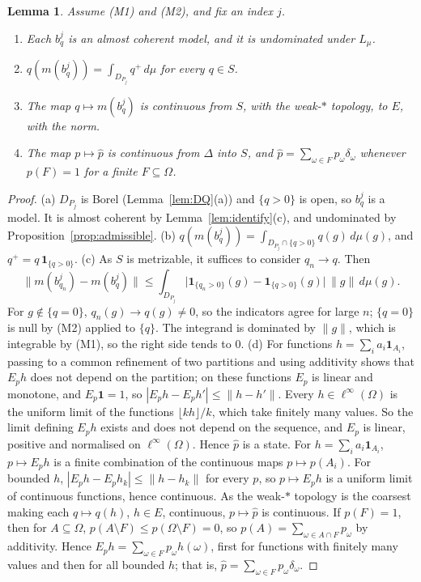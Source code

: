 \documentclass[11pt]{article}
\newtheorem{lemma}[theorem]{Lemma}
\theoremstyle{definition}
\newcommand{\one}{\mathbf 1}
\newcommand{\Lmu}{L_\mu}
\begin{document}
\begin{lemma}\label{lem:assigned}
Assume (M1) and (M2), and fix an index $j$.
\begin{enumerate}[label=(\alph*)]
\item Each $b^j_q$ is an almost coherent model, and it is undominated under $\Lmu$.
\item $q(m(b^j_q))=\int_{D_{P_j}}q^+\,d\mu$ for every $q\in S$.
\item The map $q\mapsto m(b^j_q)$ is continuous from $S$, with the weak-$\ast$ topology, to $E$, with the norm.
\item {\color{red}The map $p\mapsto\hat p$ is continuous from $\Delta$ into $S$, and $\hat p=\sum_{\omega\in F}p_\omega\delta_\omega$ whenever $p(F)=1$ for a finite $F\subseteq\Omega$.}
\end{enumerate}
\end{lemma}
\begin{proof}
(a) $D_{P_j}$ is Borel (Lemma~\ref{lem:DQ}(a)) and $\{q>0\}$ is open, so $b^j_q$ is a model. It is almost coherent by Lemma~\ref{lem:identify}(c), and undominated by Proposition~\ref{prop:admissible}.
(b) $q(m(b^j_q))=\int_{D_{P_j}\cap\{q>0\}}q(g)\,d\mu(g)$, and $q^+=q\,\one_{\{q>0\}}$.
(c) As $S$ is metrizable, it suffices to consider $q_n\to q$. Then
\[
\bigl\|m(b^j_{q_n})-m(b^j_q)\bigr\|\le\int_{D_{P_j}}\bigl|\one_{\{q_n>0\}}(g)-\one_{\{q>0\}}(g)\bigr|\,\|g\|\,d\mu(g).
\]
For $g\notin\{q=0\}$, $q_n(g)\to q(g)\ne0$, so the indicators agree for large $n$; $\{q=0\}$ is null by (M2) applied to $\{q\}$. The integrand is dominated by $\|g\|$, which is integrable by (M1), so the right side tends to $0$.
{\color{red}(d) For functions $h=\sum_ia_i\one_{A_i}$, passing to a common refinement of two partitions and using additivity shows that $E_ph$ does not depend on the partition; on these functions $E_p$ is linear and monotone, and $E_p\one=1$, so $|E_ph-E_ph'|\le\|h-h'\|$. Every $h\in\ell^\infty(\Omega)$ is the uniform limit of the functions $\lfloor kh\rfloor/k$, which take finitely many values. So the limit defining $E_ph$ exists and does not depend on the sequence, and $E_p$ is linear, positive and normalised on $\ell^\infty(\Omega)$. Hence $\hat p$ is a state. For $h=\sum_ia_i\one_{A_i}$, $p\mapsto E_ph$ is a finite combination of the continuous maps $p\mapsto p(A_i)$. For bounded $h$, $|E_ph-E_ph_k|\le\|h-h_k\|$ for every $p$, so $p\mapsto E_ph$ is a uniform limit of continuous functions, hence continuous. As the weak-$\ast$ topology is the coarsest making each $q\mapsto q(h)$, $h\in E$, continuous, $p\mapsto\hat p$ is continuous. If $p(F)=1$, then for $A\subseteq\Omega$, $p(A\setminus F)\le p(\Omega\setminus F)=0$, so $p(A)=\sum_{\omega\in A\cap F}p_\omega$ by additivity. Hence $E_ph=\sum_{\omega\in F}p_\omega h(\omega)$, first for functions with finitely many values and then for all bounded $h$; that is, $\hat p=\sum_{\omega\in F}p_\omega\delta_\omega$.}
\end{proof}
\end{document}
